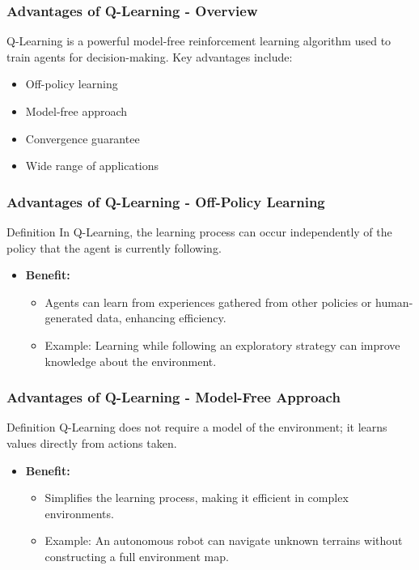 \documentclass[aspectratio=169]{beamer}
\begin{document}
\begin{frame}[fragile]
    \frametitle{Advantages of Q-Learning - Overview}
    Q-Learning is a powerful model-free reinforcement learning algorithm used to train agents for decision-making. 
    Key advantages include:
    \begin{itemize}
        \item Off-policy learning
        \item Model-free approach
        \item Convergence guarantee
        \item Wide range of applications
    \end{itemize}
\end{frame}

\begin{frame}[fragile]
    \frametitle{Advantages of Q-Learning - Off-Policy Learning}
    \begin{block}{Definition}
    In Q-Learning, the learning process can occur independently of the policy that the agent is currently following.
    \end{block}
    \begin{itemize}
        \item \textbf{Benefit:}
        \begin{itemize}
            \item Agents can learn from experiences gathered from other policies or human-generated data, enhancing efficiency.
            \item Example: Learning while following an exploratory strategy can improve knowledge about the environment.
        \end{itemize}
    \end{itemize}
\end{frame}

\begin{frame}[fragile]
    \frametitle{Advantages of Q-Learning - Model-Free Approach}
    \begin{block}{Definition}
    Q-Learning does not require a model of the environment; it learns values directly from actions taken.
    \end{block}
    \begin{itemize}
        \item \textbf{Benefit:}
        \begin{itemize}
            \item Simplifies the learning process, making it efficient in complex environments.
            \item Example: An autonomous robot can navigate unknown terrains without constructing a full environment map.
        \end{itemize}
    \end{itemize}
\end{frame}
\end{document}
